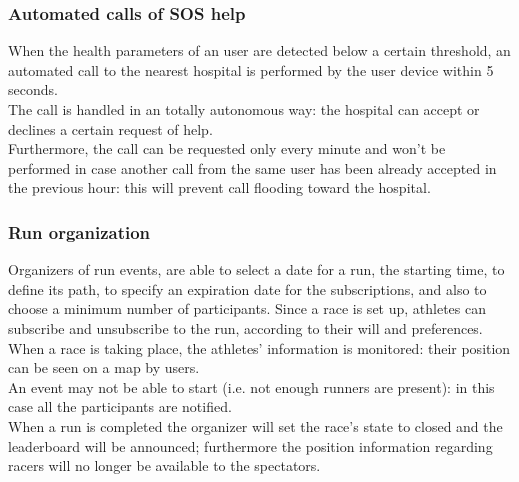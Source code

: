 \subsubsection{Automated calls of SOS help}
When the health parameters of an user are detected below a certain threshold, an automated call to the nearest hospital is performed by the user device within 5 seconds. \\
The call is handled in an totally autonomous way: the hospital can accept or declines a certain request of help. \\  
Furthermore, the call can be requested only every minute and won't be performed in case another call from the same user has been already accepted in the previous hour: this will prevent call flooding toward the hospital. 

\subsubsection{Run organization}
Organizers of run events, are able to select a date for a run, the starting time, to define its path, to specify an expiration date for the subscriptions, and also to choose a minimum number of participants.
Since a race is set up, athletes can subscribe and unsubscribe to the run, according to their will and preferences. \\
When a race is taking place, the athletes' information is monitored: their position can be seen on a map by users.\\
An event may not be able to start (i.e. not enough runners are present): in this case all the participants are notified. \\
When a run is completed the organizer will set the race's state to closed and the leaderboard will be announced; furthermore the position information regarding racers will no longer be available to the spectators.  